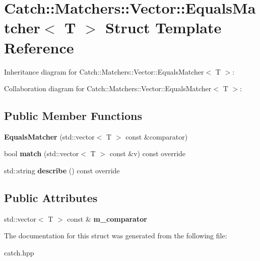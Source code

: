 \hypertarget{structCatch_1_1Matchers_1_1Vector_1_1EqualsMatcher}{}\section{Catch\+:\+:Matchers\+:\+:Vector\+:\+:Equals\+Matcher$<$ T $>$ Struct Template Reference}
\label{structCatch_1_1Matchers_1_1Vector_1_1EqualsMatcher}


Inheritance diagram for Catch\+:\+:Matchers\+:\+:Vector\+:\+:Equals\+Matcher$<$ T $>$\+:


Collaboration diagram for Catch\+:\+:Matchers\+:\+:Vector\+:\+:Equals\+Matcher$<$ T $>$\+:
\subsection*{Public Member Functions}
\begin{DoxyCompactItemize}
\item 
{\bfseries Equals\+Matcher} (std\+::vector$<$ T $>$ const \&comparator)\hypertarget{structCatch_1_1Matchers_1_1Vector_1_1EqualsMatcher_a3846c47780d1991dcfe87aefded98008}{}\label{structCatch_1_1Matchers_1_1Vector_1_1EqualsMatcher_a3846c47780d1991dcfe87aefded98008}

\item 
bool {\bfseries match} (std\+::vector$<$ T $>$ const \&v) const override\hypertarget{structCatch_1_1Matchers_1_1Vector_1_1EqualsMatcher_a2d96cca58a44151fddc5257eda3305da}{}\label{structCatch_1_1Matchers_1_1Vector_1_1EqualsMatcher_a2d96cca58a44151fddc5257eda3305da}

\item 
std\+::string {\bfseries describe} () const override\hypertarget{structCatch_1_1Matchers_1_1Vector_1_1EqualsMatcher_a36b5f7ecada4081d6c65bebe8ddea6f4}{}\label{structCatch_1_1Matchers_1_1Vector_1_1EqualsMatcher_a36b5f7ecada4081d6c65bebe8ddea6f4}

\end{DoxyCompactItemize}
\subsection*{Public Attributes}
\begin{DoxyCompactItemize}
\item 
std\+::vector$<$ T $>$ const \& {\bfseries m\+\_\+comparator}\hypertarget{structCatch_1_1Matchers_1_1Vector_1_1EqualsMatcher_a56f7aa6f110a12b1b9aeb0cabbc9d755}{}\label{structCatch_1_1Matchers_1_1Vector_1_1EqualsMatcher_a56f7aa6f110a12b1b9aeb0cabbc9d755}

\end{DoxyCompactItemize}


The documentation for this struct was generated from the following file\+:\begin{DoxyCompactItemize}
\item 
catch.\+hpp\end{DoxyCompactItemize}
